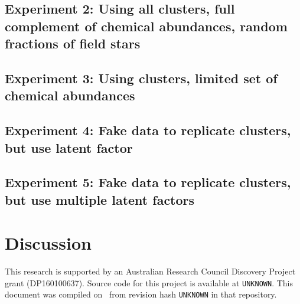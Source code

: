 \documentclass{aastex61}
\newcommand{\githash}{UNKNOWN}
\newcommand{\giturl}{UNKNOWN}}
\begin{document}
\subsection{Experiment 2: Using all clusters, full complement of chemical abundances, random fractions of field stars}

\subsection{Experiment 3: Using clusters, limited set of chemical abundances}

\subsection{Experiment 4: Fake data to replicate clusters, but use latent factor}

\subsection{Experiment 5: Fake data to replicate clusters, but use multiple latent factors}


\section{Discussion}
\label{sec:discussion}


\acknowledgments

This research is supported by an Australian Research Council Discovery Project
grant (DP160100637). 
Source code for this project is available at \texttt{\giturl}. This document
was compiled on \gitdate\ from revision hash \texttt{\githash} in that
repository. 


\end{document}
